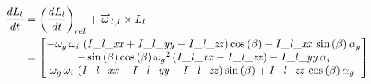 \begin{align*}
\frac{dL_{l}}{dt}&=\left(\frac{dL_{l}}{dt}\right)_{rel}+\overrightarrow{\omega}_{l,I}\times L_{l}\\
&=\begin{bmatrix}
-\omega_{g}\,\omega_{i}\, \left( {\it 
I\_l\_xx}+{\it I\_l\_yy}-{\it I\_l\_zz} \right) \cos \left( \beta
 \right) -{\it I\_l\_xx}\,\sin \left( \beta \right) \alpha_{g}
\\ 
-\sin \left( \beta \right) \cos \left( \beta
 \right) {\omega_{g}}^{2} \left( {\it I\_l\_xx}-{\it I\_l\_zz}
 \right) +{\it I\_l\_yy}\,\alpha_{i}\\ 
 \omega_{g}\,
\omega_{i}\, \left( {\it I\_l\_xx}-{\it I\_l\_yy}-{\it I\_l\_zz}
 \right) \sin \left( \beta \right) +{\it I\_l\_zz}\,\cos \left( \beta
 \right) \alpha_{g}\
\end{bmatrix}
\end{align*}

